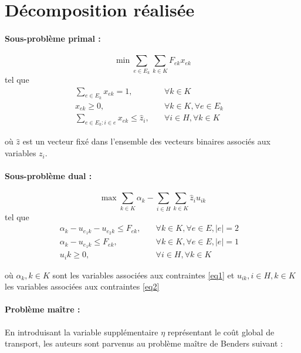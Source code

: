\section{Décomposition réalisée}

\paragraph{Sous-problème primal :}

\[ \min \sum_{e \in E_k}\sum_{k \in K}F_{ek}x_{ek}\]
tel que
\begin{subequations}
    \begin{align}
        \sum_{e \in E_k}x_{ek} = 1, \quad &\forall{k\in K}&\\
        x_{ek} \ge 0, \quad &\forall{k \in K}, \forall{e \in E_k} \label{eq1}&\\
        \sum_{e \in E_k:i\in e}x_{ek} \le \hat{z}_i,\quad &\forall{i \in H}, \forall{k\in K}\label{eq2}
    \end{align}
\end{subequations}

où $\hat{z}$ est un vecteur fixé dans l'ensemble des vecteurs binaires associés aux variables $z_i$.

\smallskip

\paragraph{Sous-problème dual : }

\[ \max \sum_{k \in K}\alpha_k - \sum_{i \in H}\sum_{k \in K} \hat{z}_iu_{ik}\]
tel que
\begin{subequations}
    \begin{align}
        \alpha_k - u_{e_1k} - u_{e_2k} \le F_{ek}, \quad &\forall{k\in K}, \forall{e \in E}, |e| = 2&\\
        \alpha_k - u_{e_1k} \le F_{ek}, \quad &\forall{k\in K}, \forall{e \in E}, |e| = 1&\\
        u_ik \ge 0, \quad &\forall{i \in H}, \forall{k \in K}
    \end{align}
\end{subequations}

où $\alpha_k, k\in K$ sont les variables associées aux contraintes \ref{eq1} et $u_{ik}, i \in H, k \in K$ les variables associées aux contraintes \ref{eq2}

\smallskip
\paragraph{Problème maître :} En introduisant la variable supplémentaire $\eta$ représentant le coût global de transport, les auteurs sont parvenus au problème maître de Benders suivant : 


